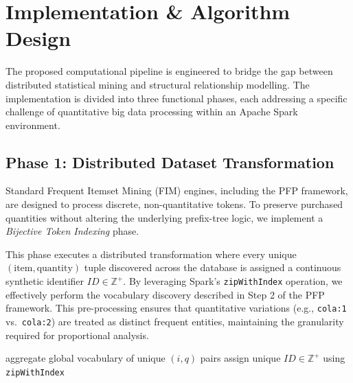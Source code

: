 \documentclass[10pt, twocolumn]{article}
\begin{document}
\section{Implementation \& Algorithm Design}

The proposed computational pipeline is engineered to bridge the gap between
distributed statistical mining and structural relationship modelling. The
implementation is divided into three functional phases, each addressing a
specific challenge of quantitative big data processing within an Apache Spark
environment.

\subsection{Phase 1: Distributed Dataset Transformation}

Standard Frequent Itemset Mining (FIM) engines, including the PFP framework,
are designed to process discrete, non-quantitative tokens. To preserve
purchased quantities without altering the underlying prefix-tree logic, we
implement a \textit{Bijective Token Indexing} phase.

This phase executes a distributed transformation where every unique
$(\text{item}, \text{quantity})$ tuple discovered across the database is
assigned a continuous synthetic identifier $ID \in \mathbb{Z}^{+}$. By
leveraging Spark's \texttt{zipWithIndex} operation, we effectively perform the
vocabulary discovery described in Step 2 of the PFP framework. This
pre-processing ensures that quantitative variations (e.g., \texttt{cola:1}
vs.\ \texttt{cola:2}) are treated as distinct frequent entities, maintaining
the granularity required for proportional analysis.

\begin{algorithm}[H]
    \caption{Bijective Token Indexing}

    aggregate global vocabulary of unique $(i, q)$ pairs\;
    assign unique $ID \in \mathbb{Z}^+$ using \texttt{zipWithIndex}\;
    \;
\end{algorithm}
\end{document}
